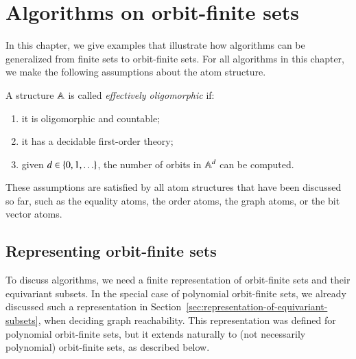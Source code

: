 \chapter{Algorithms on orbit-finite sets}
\label{cha:case-studies}

In this chapter, we give examples that illustrate how algorithms can be generalized from  finite sets to orbit-finite sets.  For all algorithms in this chapter, we make the following assumptions about the atom structure.

\begin{definition}\label{def:effectively-oligomorphic}
	A structure $\mathbb A$ is called \emph{effectively oligomorphic} if: 
	\begin{enumerate}
		\item it is oligomorphic and countable;
		\item it has a decidable first-order theory;
		\item given $d \in \{0,1,\ldots\}$, the number of orbits in $\mathbb A^d$ can be computed.
	\end{enumerate}
\end{definition}

These assumptions are satisfied by all atom structures that have been discussed so far, such as the equality atoms, the order atoms, the graph atoms, or the bit vector atoms. 

\section{Representing orbit-finite sets}
\label{sec:generating-sets-oligo}
To discuss algorithms, we need a finite representation of orbit-finite sets and their equivariant subsets. In the special case of polynomial orbit-finite sets, we already discussed such a representation in Section~\ref{sec:representation-of-equivariant-subsets}, when deciding  graph reachability. This representation was defined for polynomial orbit-finite sets, but it extends naturally to (not necessarily polynomial) orbit-finite sets, as described below.

